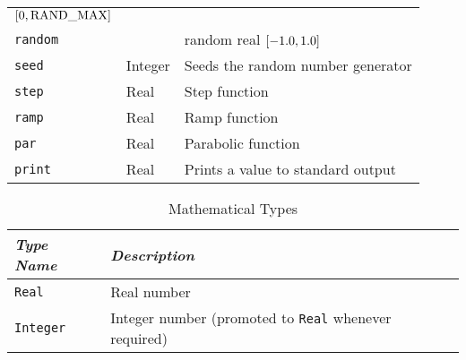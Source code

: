 \begin{table}
\begin{center}
\begin{tabular}{lll}
			$\left[ 0,\mathrm{RAND\_MAX} \right]$ \\
		\texttt{random} & & random real $\left[ -1.0,1.0 \right]$ \\
		\texttt{seed} & Integer & Seeds the random number generator \\
		\texttt{step} & Real & Step function \\
		\texttt{ramp} & Real & Ramp function \\
		\texttt{par} & Real & Parabolic function \\
		\texttt{print} & Real & Prints a value to standard output \\
		\hline
	\end{tabular}
	\end{center}
\end{table}

\begin{table}
	\begin{center}
	\caption{Mathematical Types}\label{tab:MATHP-TYPES}
	\begin{tabular}{ll}
		\hline
		\emph{Type Name} & \emph{Description} \\
		\hline
		\texttt{Real} & Real number \\
		\texttt{Integer} & Integer number (promoted to \texttt{Real} 
			whenever required) \\
		\hline
	\end{tabular}
	\end{center}
\end{table}

